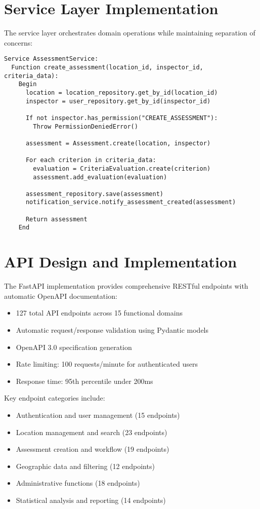 \documentclass[a4paper,12pt,oneside]{book}
\begin{document}
\section{Service Layer Implementation}

The service layer orchestrates domain operations while maintaining separation of concerns:

\begin{lstlisting}[language=Pseudocode, caption=Assessment Service Implementation]
Service AssessmentService:
  Function create_assessment(location_id, inspector_id, criteria_data):
    Begin
      location = location_repository.get_by_id(location_id)
      inspector = user_repository.get_by_id(inspector_id)
      
      If not inspector.has_permission("CREATE_ASSESSMENT"):
        Throw PermissionDeniedError()
      
      assessment = Assessment.create(location, inspector)
      
      For each criterion in criteria_data:
        evaluation = CriteriaEvaluation.create(criterion)
        assessment.add_evaluation(evaluation)
      
      assessment_repository.save(assessment)
      notification_service.notify_assessment_created(assessment)
      
      Return assessment
    End
\end{lstlisting}

\section{API Design and Implementation}

The FastAPI implementation provides comprehensive RESTful endpoints with automatic OpenAPI documentation:

\begin{itemize}
    \item 127 total API endpoints across 15 functional domains
    \item Automatic request/response validation using Pydantic models
    \item OpenAPI 3.0 specification generation
    \item Rate limiting: 100 requests/minute for authenticated users
    \item Response time: 95th percentile under 200ms
\end{itemize}

Key endpoint categories include:
\begin{itemize}
    \item Authentication and user management (15 endpoints)
    \item Location management and search (23 endpoints)
    \item Assessment creation and workflow (19 endpoints)
    \item Geographic data and filtering (12 endpoints)
    \item Administrative functions (18 endpoints)
    \item Statistical analysis and reporting (14 endpoints)
\end{itemize}
\end{document}
